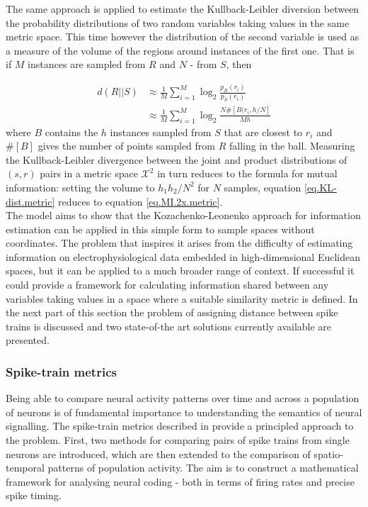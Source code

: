 \documentclass[12pt]{extarticle}
\begin{document}
\noindent
The same approach is applied to estimate the Kullback-Leibler
diversion between the probability distributions of two random
variables taking values in the same metric space. This time however
the distribution of the second variable is used as a measure of the
volume of the regions around instances of the first one. That is if
$M$ instances are sampled from $R$ and $N$ - from $S$, then

\begin{equation}
\begin{aligned}
d(R||S) &\approx \frac{1}{M} \sum_{i=1}^{M} \log_2 \frac{p_R(r_i)}{p_S(r_i)}\\
		&\approx \frac{1}{M} \sum_{i=1}^{M} \log_2 \frac{N\#[B(r_i,h/N]}{Mh}
\end{aligned}
\label{eq.KL-dist.metric}
\end{equation}
where $B$ contains the $h$ instances sampled from $S$ that are closest to $r_i$ and $\#[B]$ gives the number of points sampled from $R$ falling in the ball.
Measuring the Kullback-Leibler divergence between the joint and product
distributions of $(s,r)$ pairs in a metric space $\mathcal{X}^2$ in
turn reduces to the formula for mutual information: setting the volume
to $h_1h_2/N^2$ for $N$ samples, equation \ref{eq.KL-dist.metric} reduces to equation
\ref{eq.MI.2x.metric}.\\

\noindent
The model aims to show that the Kozachenko-Leonenko approach for
information estimation can be applied in this simple form to sample
spaces without coordinates. The problem that inspires it arises from
the difficulty of estimating information on electrophysiological data
embedded in high-dimensional Euclidean spaces, 
but it can be applied to a much broader range of context. If
successful it could provide a framework for calculating information
shared between any variables taking values in a space where a suitable
similarity metric is defined. In the next part of this section the
problem of assigning distance between spike trains is discussed and
two state-of-the art solutions currently available are presented.\\

\subsubsection*{Spike-train metrics}
\noindent
Being able to compare neural activity patterns over time and across a
population of neurons is of fundamental importance to understanding
the semantics of neural signalling. The spike-train metrics described
in \cite{Houghton-Victor} provide a principled approach to the problem. First,
two methods for comparing pairs of spike trains from single neurons
are introduced, which are then extended to the comparison of
spatio-temporal patterns of population activity. The aim is to
construct a mathematical framework for analysing neural coding - both
in terms of firing rates and precise spike timing.\\
\end{document}
